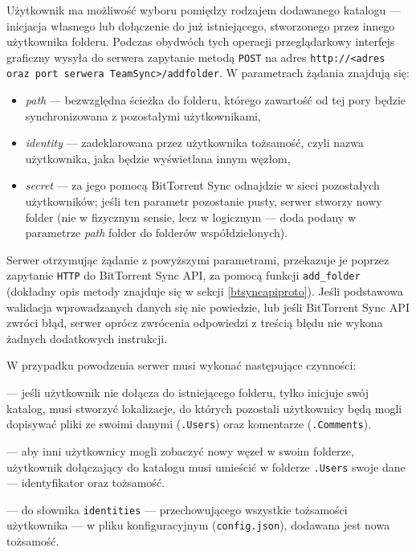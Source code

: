 \documentclass[polish,a4paper,twoside]{ppfcmthesis}
\begin{document}
Użytkownik ma możliwość wyboru pomiędzy rodzajem dodawanego katalogu --- inicjacja własnego lub dołączenie do już istniejącego, stworzonego przez innego użytkownika folderu. Podczas obydwóch tych operacji przeglądarkowy interfejs graficzny wysyła do serwera zapytanie metodą \texttt{POST} na adres \texttt{http://<adres oraz port serwera TeamSync>\-/addfolder}. W parametrach żądania znajdują się:

\begin{itemize}[noitemsep]
  \item \emph{path} --- bezwzględna ścieżka do folderu, którego zawartość od tej pory będzie synchronizowana z pozostałymi użytkownikami,
  
  \item \emph{identity} --- zadeklarowana przez użytkownika tożsamość, czyli nazwa użytkownika, jaka będzie wyświetlana innym węzłom,
  
  \item \emph{secret} --- za jego pomocą BitTorrent Sync odnajdzie w sieci pozostałych użytkowników; jeśli ten parametr pozostanie pusty, serwer stworzy nowy folder (nie w fizycznym sensie, lecz w logicznym --- doda podany w parametrze \emph{path} folder do folderów współdzielonych).
\end{itemize}

Serwer otrzymując żądanie z powyższymi parametrami, przekazuje je poprzez zapytanie \texttt{HTTP} do BitTorrent Sync API, za pomocą funkcji \texttt{add\_folder} (dokładny opis metody znajduje się w sekcji \ref{btsyncapiproto}). Jeśli podstawowa walidacja wprowadzanych danych się nie powiedzie, lub jeśli BitTorrent Sync API zwróci błąd, serwer oprócz zwrócenia odpowiedzi z treścią błędu nie wykona żadnych dodatkowych instrukcji.

W przypadku powodzenia serwer musi wykonać następujące czynności:

\begin{description}[noitemsep]
  \item[Utworzenie folderów \texttt{.Comments} oraz \texttt{.Users}] --- jeśli użytkownik nie dołącza do istniejącego folderu, tylko inicjuje swój katalog, musi stworzyć lokalizacje, do których pozostali użytkownicy będą mogli dopisywać pliki ze swoimi danymi (\texttt{.Users}) oraz komentarze (\texttt{.Comments}).
  
  \item[Uaktualnienie folderu \texttt{.Users}] --- aby inni użytkownicy mogli zobaczyć nowy węzeł w swoim folderze, użytkownik dołączający do katalogu musi umieścić w folderze \texttt{.Users} swoje dane --- identyfikator oraz tożsamość.
  
  \item[Uaktualnienie pliku konfiguracyjnego] --- do słownika \texttt{identities} --- przechowującego wszystkie tożsamości użytkownika --- w pliku konfiguracyjnym (\texttt{config.json}), dodawana jest nowa tożsamość.
\end{description}
\end{document}
